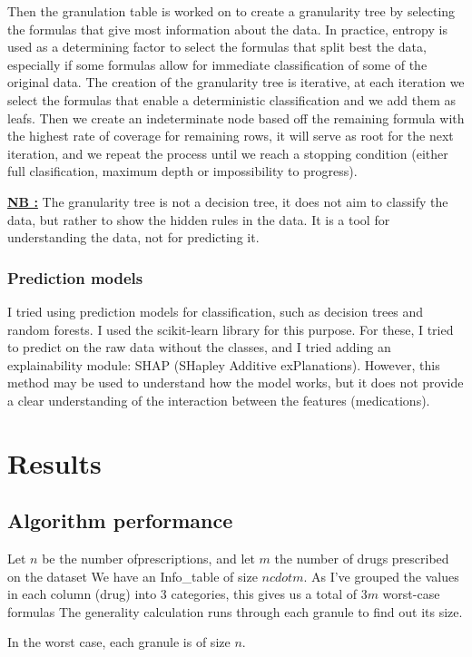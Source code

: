 \documentclass[a4paper,12pt]{article}
\begin{document}
Then the granulation table is worked on to create a granularity tree by selecting the formulas that give most information about the data.
In practice, entropy is used as a determining factor to select the formulas that split best the data, especially if some formulas allow for immediate classification of some of the original data.
The creation of the granularity tree is iterative, at each iteration we select the formulas that enable a deterministic classification and we add them as leafs.
Then we create an indeterminate node based off the remaining formula with the highest rate of coverage for remaining rows, it will serve as root for the next iteration, and we repeat the process until we reach a stopping condition (either full clasification, maximum depth or impossibility to progress).

\textbf{\underline{NB :}} The granularity tree is not a decision tree, it does not aim to classify the data, but rather to show the hidden rules in the data. It is a tool for understanding the data, not for predicting it. 

\subsubsection{Prediction models}
I tried using prediction models for classification, such as decision trees and random forests. I used the scikit-learn library for this purpose.
For these, I tried to predict on the raw data without the classes, and I tried adding an explainability module: SHAP (SHapley Additive exPlanations).
However, this method may be used to understand how the model works, but it does not provide a clear understanding of the interaction between the features (medications).


\section{Results}
\subsection{Algorithm performance}
Let $n$ be the number ofprescriptions, and let $m$ the number of drugs prescribed on the dataset
We have an Info_table of size $ncdot m$.
As I've grouped the values in each column (drug) into 3 categories, this gives us a total of $3m$ worst-case formulas
The generality calculation runs through each granule to find out its size.

In the worst case, each granule is of size $n$.
\end{document}
